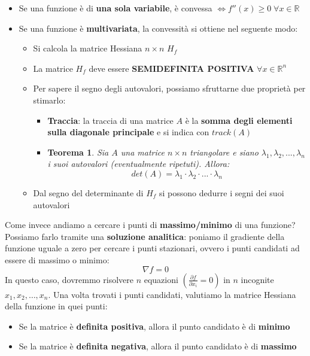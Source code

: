 \documentclass[12pt]{article}
\newtheorem{Teorema}{Teorema}[subsection]
\begin{document}
\begin{itemize}
    \item Se una funzione è di \textbf{una sola variabile}, è convessa $\Leftrightarrow f''(x) \geq 0 \; \forall x \in \mathbb{R}$
    \item Se una funzione è \textbf{multivariata}, la convessità si ottiene nel seguente modo:
    \begin{itemize}
        \item Si calcola la matrice Hessiana $n \times n$ $H_f$
        \item La matrice $H_f$ deve essere \textbf{SEMIDEFINITA POSITIVA} $\forall x \in \mathbb{R}^n$
        \item Per sapere il segno degli autovalori, possiamo sfruttarne due proprietà per stimarlo:
        \begin{itemize}
            \item \textbf{Traccia}: la traccia di una matrice $A$ è la \textbf{somma degli elementi sulla diagonale principale} e si indica con $track(A)$
            \item \begin{Teorema}
                Sia $A$ una matrice $n \times n$ triangolare e siano $\lambda_1, \lambda_2, ..., \lambda_n$ i suoi autovalori (eventualmente ripetuti). Allora: $$det(A) = \lambda_1 \cdot \lambda_2 \cdot ... \cdot \lambda_n$$
            \end{Teorema}
        \end{itemize}
        \item Dal segno del determinante di $H_f$ si possono dedurre i segni dei suoi autovalori
    \end{itemize}
\end{itemize}
Come invece andiamo a cercare i punti di \textbf{massimo/minimo} di una funzione? Possiamo farlo tramite una \textbf{soluzione analitica}:
poniamo il gradiente della funzione uguale a zero per cercare i punti stazionari, ovvero i punti candidati ad essere di massimo o minimo:
$$\nabla f = 0$$
In questo caso, dovremmo risolvere $n$ equazioni $(\frac{\partial f}{\partial x_i} = 0)$ in $n$ incognite $x_1,x_2,\dots,x_n$. Una volta trovati i punti candidati,
valutiamo la matrice Hessiana della funzione in quei punti:
\begin{itemize}
    \item Se la matrice è \textbf{definita positiva}, allora il punto candidato è di \textbf{minimo}
    \item Se la matrice è \textbf{definita negativa}, allora il punto candidato è di \textbf{massimo}
\end{itemize}
\end{document}
